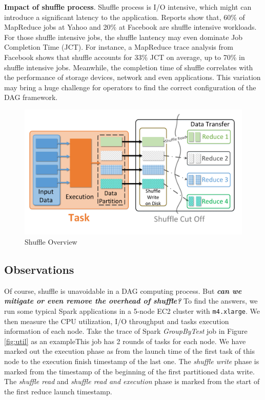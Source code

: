 
\textbf{Impact of shuffle process}. Shuffle process is I/O intensive, which might can introduce a significant latency to the application. Reports show that, 60\% of MapReduce jobs at Yahoo
and 20\% at Facebook are shuffle intensive workloads\cite{shufflewatcher}. For those shuffle intensive jobs, the shuffle lantency may even dominate Job Completion Time (JCT). 
For instance, a MapReduce trace analysis from Facebook shows that shuffle accounts for 33\% JCT on average, up to 70\% in shuffle intensive jobs\cite{managing}.
Meanwhile, the completion time of shuffle correlates with the performance of storage devices, network and even applications. 
This variation may bring a huge challenge for operators to find the correct configuration of the DAG framework.
\begin{figure}
	\centering
	\includegraphics[width=\linewidth]{fig/shuffle_process}
	\caption{Shuffle Overview}
	\label{fig:shuffle_process}
\end{figure}

\subsection{Observations} \label{observation}
Of course, shuffle is unavoidable in a DAG computing process. But \textbf{\textit{can we mitigate or even remove the overhead of shuffle?}} To find the answers, we run some typical Spark applications in a 5-node EC2 cluster with \texttt{m4.xlarge}. We then measure the CPU utilization, I/O throughput and tasks execution information of each node. Take the trace of Spark \textit{GroupByTest} job in Figure \ref{fig:util} as an exampleThis job has 2 rounds of tasks for each node. 
We have marked out the execution phase as from the launch time of the first task of this node to the execution finish timestamp of the last one. The \textit{shuffle write} phase is marked from the timestamp of the beginning of the first partitioned data write. The \textit{shuffle read} and \textit{shuffle read and execution} phase is marked from the start of the first reduce launch timestamp.

